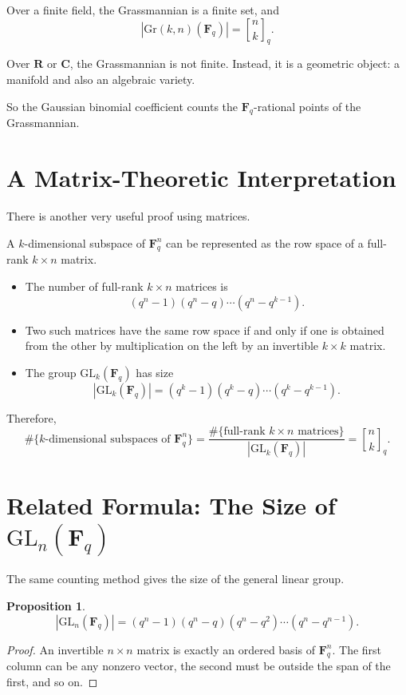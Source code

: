 \documentclass[11pt]{article}
\newtheorem{proposition}[theorem]{Proposition}
\theoremstyle{definition}
\theoremstyle{remark}
\newcommand{\F}{\mathbf{F}}
\newcommand{\R}{\mathbf{R}}
\newcommand{\C}{\mathbf{C}}
\newcommand{\Gr}{\mathrm{Gr}}
\newcommand{\GL}{\mathrm{GL}}
\newcommand{\qbinom}[2]{\genfrac{[}{]}{0pt}{}{#1}{#2}_q}
\begin{document}
	Over a finite field, the Grassmannian is a finite set, and
	\[
	|\Gr(k,n)(\F_q)|=\qbinom{n}{k}.
	\]
	
	Over \(\R\) or \(\C\), the Grassmannian is not finite. Instead, it is a geometric object: a manifold and also an algebraic variety.
	
	So the Gaussian binomial coefficient counts the \(\F_q\)-rational points of the Grassmannian.
	
	\section{A Matrix-Theoretic Interpretation}
	
	There is another very useful proof using matrices.
	
	A \(k\)-dimensional subspace of \(\F_q^n\) can be represented as the row space of a full-rank \(k\times n\) matrix.
	
	\begin{itemize}
		\item The number of full-rank \(k\times n\) matrices is
		\[
		(q^n-1)(q^n-q)\cdots(q^n-q^{k-1}).
		\]
		\item Two such matrices have the same row space if and only if one is obtained from the other by multiplication on the left by an invertible \(k\times k\) matrix.
		\item The group \(\GL_k(\F_q)\) has size
		\[
		|\GL_k(\F_q)|=(q^k-1)(q^k-q)\cdots(q^k-q^{k-1}).
		\]
	\end{itemize}
	
	Therefore,
	\[
	\#\{\text{\(k\)-dimensional subspaces of }\F_q^n\}
	=
	\frac{\#\{\text{full-rank }k\times n\text{ matrices}\}}
	{|\GL_k(\F_q)|}
	=
	\qbinom{n}{k}.
	\]
	
	\section{Related Formula: The Size of \(\GL_n(\F_q)\)}
	
	The same counting method gives the size of the general linear group.
	
	\begin{proposition}
		\[
		|\GL_n(\F_q)|=(q^n-1)(q^n-q)(q^n-q^2)\cdots(q^n-q^{n-1}).
		\]
	\end{proposition}
	
	\begin{proof}
		An invertible \(n\times n\) matrix is exactly an ordered basis of \(\F_q^n\). The first column can be any nonzero vector, the second must be outside the span of the first, and so on.
	\end{proof}
	
\end{document}
